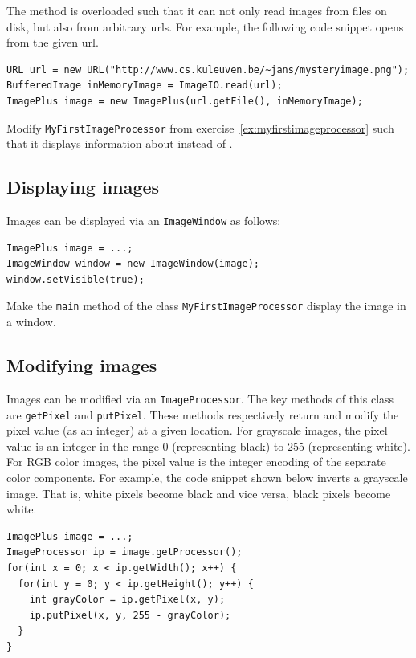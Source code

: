 \documentclass{book}
\begin{document}
The method  is overloaded such that it can not only read images from files on disk, but also from arbitrary urls. For example,  the following code snippet opens  from the given url.
\begin{lstlisting}
URL url = new URL("http://www.cs.kuleuven.be/~jans/mysteryimage.png");
BufferedImage inMemoryImage = ImageIO.read(url);
ImagePlus image = new ImagePlus(url.getFile(), inMemoryImage);
\end{lstlisting}

\begin{exercise}
Modify \texttt{MyFirstImageProcessor} from exercise~\ref{ex:myfirstimageprocessor} such that it displays information about  instead of .
\end{exercise}

\subsection{Displaying images}
Images can be displayed via an \texttt{ImageWindow} as follows:
\begin{lstlisting}
ImagePlus image = ...;
ImageWindow window = new ImageWindow(image);
window.setVisible(true);
\end{lstlisting}
\begin{exercise}
Make the \texttt{main} method of the class \texttt{MyFirstImageProcessor} display the image in a window.
\end{exercise}

\subsection{Modifying images}
Images can be modified via an \texttt{ImageProcessor}. The key methods of this class are \texttt{getPixel} and \texttt{putPixel}. These methods respectively return and modify the pixel value (as an integer) at a given location. For grayscale images, the pixel value is an integer in the range 0 (representing black) to 255 (representing white). For RGB color images, the pixel value is the integer encoding of the separate color components.  For example, the code snippet shown below inverts a grayscale image. That is, white pixels become black and vice versa, black pixels become white.

\begin{lstlisting}
ImagePlus image = ...;
ImageProcessor ip = image.getProcessor();
for(int x = 0; x < ip.getWidth(); x++) {
  for(int y = 0; y < ip.getHeight(); y++) {
    int grayColor = ip.getPixel(x, y);
    ip.putPixel(x, y, 255 - grayColor);
  }  
}
\end{lstlisting}
\end{document}
